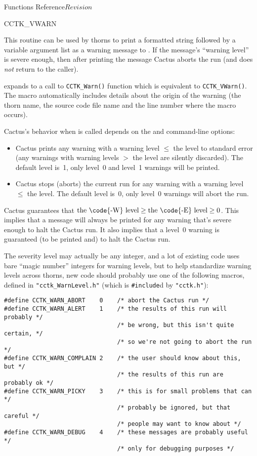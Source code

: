 \begin{cactuspart}{ Functions Reference}{}{$Revision$}
\begin{FunctionDescription}{CCTK\_VWARN}
\begin{Discussion}
This routine can be used by thorns to print a formatted string followed
by a variable argument list as a warning message to .  If
the message's ``warning level'' is severe enough, then after printing
the message Cactus aborts the run (and  does {\em not\/}
return to the caller).

 expands to a call to \verb|CCTK_Warn()|
function which is equivalent to \verb|CCTK_VWarn()|.
The macro automatically includes details about the origin of the warning
(the thorn name, the source code file name and the line number where the macro
occurs).

Cactus's behavior when  is called depends on the
 and  command-line options:
\begin{itemize}
\item   Cactus prints any warning with a warning level $\le$
        the  level to standard error (any warnings with
        warning levels $>$ the  level are silently discarded).
        The default  level is~1, \ie{} only level~0 and level~1
        warnings will be printed.
\item   Cactus stops (aborts) the current run for any warning
        with a warning level $\le$ the  level.
        The default  level is~0, \ie{} only level~0
        warnings will abort the run.
\end{itemize}

Cactus guarantees that
$\mbox{the \code{-W}~level} \ge \mbox{the \code{-E}~level} \ge 0$.
This implies that a message will always be printed for any warning that's
severe enough to halt the Cactus run.  It also implies that a level~0
warning is guaranteed (to be printed and) to halt the Cactus run.

The severity level may actually be any integer, and a lot of existing
code uses bare ``magic number'' integers for warning levels, but to
help standardize warning levels across thorns, new code should probably
use one of the following macros, defined in \verb|"cctk_WarnLevel.h"|
(which is \verb|#include|d by \verb|"cctk.h"|):
\begin{verbatim}
#define CCTK_WARN_ABORT    0    /* abort the Cactus run */
#define CCTK_WARN_ALERT    1    /* the results of this run will probably */
                                /* be wrong, but this isn't quite certain, */
                                /* so we're not going to abort the run */
#define CCTK_WARN_COMPLAIN 2    /* the user should know about this, but */
                                /* the results of this run are probably ok */
#define CCTK_WARN_PICKY    3    /* this is for small problems that can */
                                /* probably be ignored, but that careful */
                                /* people may want to know about */
#define CCTK_WARN_DEBUG    4    /* these messages are probably useful */
                                /* only for debugging purposes */
\end{verbatim}


\end{Discussion}
\end{FunctionDescription}
\end{cactuspart}
